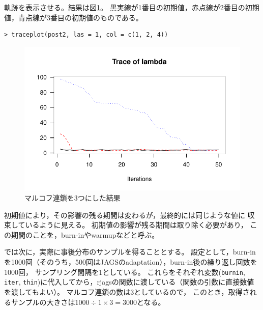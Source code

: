 \documentclass[11pt,uplatex]{jsarticle}
\begin{document}
軌跡を表示させる。結果は図\ref{fig:trace3}。  黒実線が1番目の初期値，赤点線が2番目の初期値，青点線が3番目の初期値のものである。
\begin{lstlisting}
> traceplot(post2, las = 1, col = c(1, 2, 4))
\end{lstlisting}

\begin{figure}[hbtp]
  \begin{center}
    \includegraphics[bb=0 0 360 240, clip, width=260 bp]{example1-2.pdf}
  \end{center}
  \caption{マルコフ連鎖を3つにした結果}
  \label{fig:trace3}
\end{figure}\noindent

初期値により，その影響の残る期間は変わるが，最終的には同じような値に
収束しているように見える。
初期値の影響が残る期間は取り除く必要があり，
この期間のことを，burn-inやwarmupなどと呼ぶ。

では次に，実際に事後分布のサンプルを得ることとする。
設定として，burn-inを1000回（そのうち，500回は\textsf{JAGS}のadaptation），burn-in後の繰り返し回数を1000回，
サンプリング間隔を1としている。
これらをそれぞれ変数(\texttt{burnin}, \texttt{iter}, \texttt{thin})に代入してから，\textsf{rjags}の関数に渡している（関数の引数に直接数値を渡してもよい）。
マルコフ連鎖の数は3としているので，
このとき，取得されるサンプルの大きさは$1000 \div 1 \times 3 = 3000$となる。

\vspace{1.5cm}
\end{document}
